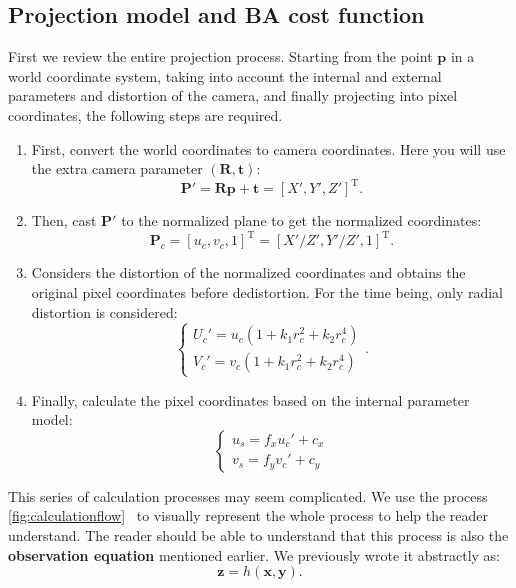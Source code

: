 \subsection{Projection model and BA cost function}
First we review the entire projection process. Starting from the point $\bm{p}$ in a world coordinate system, taking into account the internal and external parameters and distortion of the camera, and finally projecting into pixel coordinates, the following steps are required.

\begin{enumerate}
\item First, convert the world coordinates to camera coordinates. Here you will use the extra camera parameter $(\bm{R}, \bm{t})$:
\begin{equation}
\bm{P}' = \bm{R} \bm{p} + \bm{t} = [X', Y', Z']^\mathrm{T}.
\end{equation}
\item Then, cast $\bm{P}'$ to the normalized plane to get the normalized coordinates:
\begin{equation}
\bm{P}_c = [u_c, v_c, 1]^\mathrm{T} = [X'/Z', Y'/Z', 1]^\mathrm{T}.
\end{equation}
\item Considers the distortion of the normalized coordinates and obtains the original pixel coordinates before dedistortion.
For the time being, only radial distortion is considered:
\begin{equation}
\left\{
\begin{array}{l}
U_c' = {u_c}\left( {1 + {k_1}r_c^2 + {k_2}r_c^4} \right)\\
V_c' = {v_c}\left( {1 + {k_1}r_c^2 + {k_2}r_c^4} \right)
\end{array}
\right. .
\end{equation}
\item Finally, calculate the pixel coordinates based on the internal parameter model:
\begin{equation}
\left\{ \begin{array}{l}
{u_s} = {f_x}u_c' + {c_x}\\
{v_s} = {f_y}v_c' + {c_y}
\end{array} \right.
\end{equation}
\end{enumerate}

This series of calculation processes may seem complicated. We use the process \autoref{fig:calculationflow}~ to visually represent the whole process to help the reader understand. The reader should be able to understand that this process is also the \textbf{observation equation} mentioned earlier. We previously wrote it abstractly as:
\begin{equation}
\bm{z} = h(\bm{x}, \bm{y}).
\end{equation}

